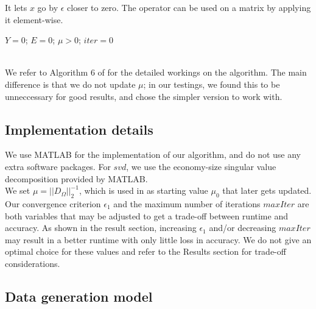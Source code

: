 \documentclass[10pt,conference,compsocconf]{IEEEtran}
\begin{document}
It lets $x$ go by $\epsilon$ closer to zero. The operator can be used on a matrix by applying it element-wise.


\begin{algorithm}
$Y = 0$; $E = 0$; $\mu > 0$; $iter = 0$ \\
\ \\

\end{algorithm}

We refer to Algorithm 6 of \cite{almpaper} for the detailed workings on the algorithm. The main difference is
that we do not update $\mu$; in our testings, we found this to be unneccessary for good results, and chose
the simpler version to work with.

\subsection{Implementation details}

We use MATLAB for the implementation of our algorithm, and do not use any extra software packages.
For $svd$, we use the economy-size singular value decomposition provided by MATLAB. \\

We set $\mu = ||D_{\Omega}||_2^{-1}$, which is used in \cite{almpaper} as starting value $\mu_0$ that later gets updated. \\

Our convergence criterion $\epsilon_1$ and the maximum number of iterations $maxIter$ are both variables that may be adjusted
to get a trade-off between runtime and accuracy. As shown in the result section, increasing $\epsilon_1$ and/or decreasing $maxIter$
may result in a better runtime with only little loss in accuracy. We do not give an optimal choice for these values and refer to the Results section for trade-off considerations.


\subsection{Data generation model}
\end{document}
